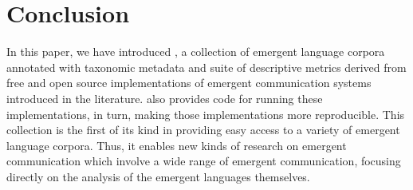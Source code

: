 \section{Conclusion}
\unskip\label{elcc:sec:conclusion}

In this paper, we have introduced \theLib{}, a collection of emergent language corpora annotated with taxonomic metadata and suite of descriptive metrics derived from free and open source implementations of emergent communication systems introduced in the literature.
\theLib{} also provides code for running these implementations, in turn, making those implementations more reproducible.
This collection is the first of its kind in providing easy access to a variety of emergent language corpora.
Thus, it enables new kinds of research on emergent communication which involve a wide range of emergent communication, focusing directly on the analysis of the emergent languages themselves.
